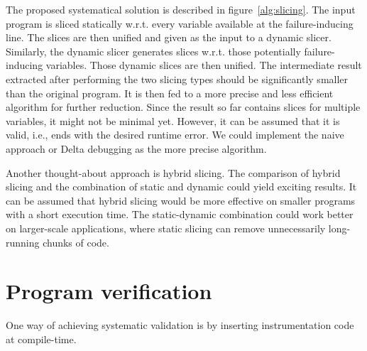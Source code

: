 The proposed systematical solution is described in figure~\ref{alg:slicing}.
The input program is sliced statically w.r.t.
every variable available at the failure-inducing line.
The slices are then unified and given as the input to a dynamic slicer.
Similarly, the dynamic slicer generates slices w.r.t.
those potentially failure-inducing variables.
Those dynamic slices are then unified.
The intermediate result extracted after performing the two slicing types 
should be significantly smaller than the original program.
It is then fed to a more precise and less efficient algorithm for further 
reduction.
Since the result so far contains slices for multiple variables, it might not 
be minimal yet.
However, it can be assumed that it is valid, i.e., ends with the desired 
runtime error.
We could implement the naive approach or Delta debugging as the more 
precise algorithm.


Another thought-about approach is hybrid slicing.
The comparison of hybrid slicing and the combination of static and dynamic 
could yield exciting results.
It can be assumed that hybrid slicing would be more effective on smaller 
programs with a short execution time.
The static-dynamic combination could work better on larger-scale 
applications, where static slicing can remove unnecessarily long-running 
chunks of code.


\section{Program verification}




One way of achieving systematic validation is by inserting 
instrumentation code at compile-time.

